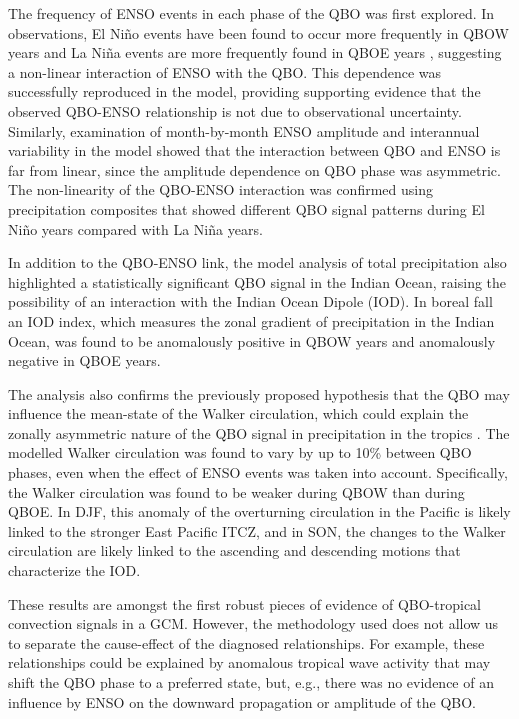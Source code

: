 The frequency of ENSO events in each phase of the QBO was first explored. In observations, El Niño events have been found to occur more frequently in QBOW years and La Niña events are more frequently found in QBOE years \citep{taguchi2010}, suggesting a non-linear interaction of ENSO with the QBO. This dependence was successfully reproduced in the model, providing supporting evidence that the observed QBO-ENSO relationship is not due to observational uncertainty. Similarly, examination of month-by-month ENSO amplitude and interannual variability in the model showed that the interaction between QBO and ENSO is far from linear, since the amplitude dependence on QBO phase was asymmetric. The non-linearity of the QBO-ENSO interaction was confirmed using precipitation composites that showed different QBO signal patterns during El Niño years compared with La Niña years. 

In addition to the QBO-ENSO link, the model analysis of total precipitation also highlighted a statistically significant QBO signal in the Indian Ocean, raising the possibility of an interaction with the Indian Ocean Dipole (IOD). In boreal fall an IOD index, which measures the zonal gradient of precipitation in the Indian Ocean, was found to be anomalously positive in QBOW years and anomalously negative in QBOE years. 

The analysis also confirms the previously proposed hypothesis that the QBO may influence the mean-state of the Walker circulation, which could explain the zonally asymmetric nature of the QBO signal in precipitation in the tropics \citep{collimore2003,liess2012,hitchman2021observational}. The modelled Walker circulation was found to vary by up to 10\% between QBO phases, even when the effect of ENSO events was taken into account. Specifically, the Walker circulation was found to be weaker during QBOW than during QBOE. In DJF, this anomaly of the overturning circulation in the Pacific is likely linked to the stronger East Pacific ITCZ, and in SON, the changes to the Walker circulation are likely linked to the ascending and descending motions that characterize the IOD. 
 
These results are amongst the first robust pieces of evidence of QBO-tropical convection signals in a GCM. However, the methodology used does not allow us to separate the cause-effect of the diagnosed relationships. For example, these relationships could be explained by anomalous tropical wave activity that may shift the QBO phase to a preferred state, but, e.g., there was no evidence of an influence by ENSO on the downward propagation or amplitude of the QBO.  

